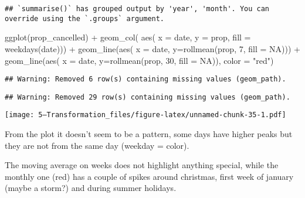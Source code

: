 \documentclass[
]{article}
\newenvironment{Shaded}{\begin{snugshade}}{\end{snugshade}}
\newcommand{\AttributeTok}[1]{\textcolor[rgb]{0.77,0.63,0.00}{#1}}
\newcommand{\ConstantTok}[1]{\textcolor[rgb]{0.00,0.00,0.00}{#1}}
\newcommand{\DecValTok}[1]{\textcolor[rgb]{0.00,0.00,0.81}{#1}}
\newcommand{\FunctionTok}[1]{\textcolor[rgb]{0.00,0.00,0.00}{#1}}
\newcommand{\NormalTok}[1]{#1}
\newcommand{\SpecialCharTok}[1]{\textcolor[rgb]{0.00,0.00,0.00}{#1}}
\newcommand{\StringTok}[1]{\textcolor[rgb]{0.31,0.60,0.02}{#1}}
\begin{document}
\begin{verbatim}
## `summarise()` has grouped output by 'year', 'month'. You can override using the `.groups` argument.
\end{verbatim}

\begin{Shaded}
\begin{Highlighting}[]
\FunctionTok{ggplot}\NormalTok{(prop\_cancelled) }\SpecialCharTok{+}
  \FunctionTok{geom\_col}\NormalTok{( }\FunctionTok{aes}\NormalTok{( }\AttributeTok{x =}\NormalTok{ date, }\AttributeTok{y =}\NormalTok{ prop, }\AttributeTok{fill =} \FunctionTok{weekdays}\NormalTok{(date))) }\SpecialCharTok{+}
  \FunctionTok{geom\_line}\NormalTok{(}\FunctionTok{aes}\NormalTok{( }\AttributeTok{x =}\NormalTok{ date, }\AttributeTok{y=}\FunctionTok{rollmean}\NormalTok{(prop, }\DecValTok{7}\NormalTok{, }\AttributeTok{fill =} \ConstantTok{NA}\NormalTok{))) }\SpecialCharTok{+}
  \FunctionTok{geom\_line}\NormalTok{(}\FunctionTok{aes}\NormalTok{( }\AttributeTok{x =}\NormalTok{ date, }\AttributeTok{y=}\FunctionTok{rollmean}\NormalTok{(prop, }\DecValTok{30}\NormalTok{, }\AttributeTok{fill =} \ConstantTok{NA}\NormalTok{)), }\AttributeTok{color =} \StringTok{"red"}\NormalTok{)}
\end{Highlighting}
\end{Shaded}

\begin{verbatim}
## Warning: Removed 6 row(s) containing missing values (geom_path).
\end{verbatim}

\begin{verbatim}
## Warning: Removed 29 row(s) containing missing values (geom_path).
\end{verbatim}

\texttt{[image: 5---Transformation\_files/figure-latex/unnamed-chunk-35-1.pdf]}

From the plot it doesn't seem to be a pattern, some days have higher
peaks but they are not from the same day (weekday = color).

The moving average on weeks does not highlight anything special, while
the monthly one (red) has a couple of spikes around christmas, first
week of january (maybe a storm?) and during summer holidays.
\end{document}
